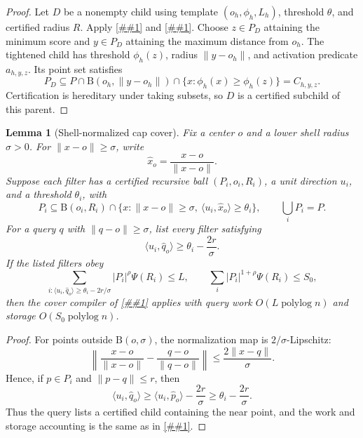 \documentclass[10pt]{article}
\newcommand{\cref}[1]{\ref{##1}}
\newtheorem{lemma}[theorem]{Lemma}
\theoremstyle{definition}
\newcommand{\Ball}{\mathrm{B}}
\newcommand{\polylog}{\operatorname{polylog}}
\begin{document}
\begin{proof}
   Let $D$ be a nonempty child using template $(o_h,\phi_h,L_h)$, threshold
   $\theta$, and certified radius $R$.  Apply
   \cref{lem:threshold-tightening} and \cref{lem:radius-tightening}.  Choose
   $z\in P_D$ attaining the minimum score and $y\in P_D$ attaining the maximum
   distance from $o_h$.  The tightened child has threshold $\phi_h(z)$, radius
   $\|y-o_h\|$, and activation predicate $a_{h,y,z}$.  Its point set satisfies
   \[
      P_D\subseteq
      P\cap\Ball(o_h,\|y-o_h\|)
      \cap\{x:\phi_h(x)\ge\phi_h(z)\}
      =
      C_{h,y,z}.
   \]
   Certification is hereditary under taking subsets, so $D$ is a certified
   subchild of this parent.
\end{proof}

\begin{lemma}[Shell-normalized cap cover]\label{lem:shell-normalized-cap-cover}
   Fix a center $o$ and a lower shell radius $\sigma>0$.  For
   $\|x-o\|\ge\sigma$, write
   \[
      \widehat x_o=\frac{x-o}{\|x-o\|}.
   \]
   Suppose each filter has a certified recursive ball $(P_i,o_i,R_i)$,
   a unit direction $u_i$, and a threshold $\theta_i$, with
   \[
      P_i\subseteq \Ball(o_i,R_i)
      \cap
      \{x:\|x-o\|\ge\sigma,\ \langle u_i,\widehat x_o\rangle\ge\theta_i\},
      \qquad
      \bigcup_iP_i=P .
   \]
   For a query $q$ with $\|q-o\|\ge\sigma$, list every filter satisfying
   \[
      \langle u_i,\widehat q_o\rangle
      \ge
      \theta_i-\frac{2r}{\sigma}.
   \]
   If the listed filters obey
   \[
      \sum_{i:\langle u_i,\widehat q_o\rangle\ge\theta_i-2r/\sigma}
      |P_i|^\rho\Psi(R_i)\le L,
      \qquad
      \sum_i |P_i|^{1+\rho}\Psi(R_i)\le S_0,
   \]
   then the cover compiler of \cref{lem:certified-cover-compiler} applies with
   query work $O(L\polylog n)$ and storage $O(S_0\polylog n)$.
\end{lemma}

\begin{proof}
   For points outside $\Ball(o,\sigma)$, the normalization map is
   $2/\sigma$-Lipschitz:
   \[
      \left\|
      \frac{x-o}{\|x-o\|}
      -
      \frac{q-o}{\|q-o\|}
      \right\|
      \le
      \frac{2\|x-q\|}{\sigma}.
   \]
   Hence, if $p\in P_i$ and $\|p-q\|\le r$, then
   \[
      \langle u_i,\widehat q_o\rangle
      \ge
      \langle u_i,\widehat p_o\rangle-\frac{2r}{\sigma}
      \ge
      \theta_i-\frac{2r}{\sigma}.
   \]
   Thus the query lists a certified child containing the near point, and the
   work and storage accounting is the same as in
   \cref{lem:certified-cover-compiler}.
\end{proof}
\end{document}
